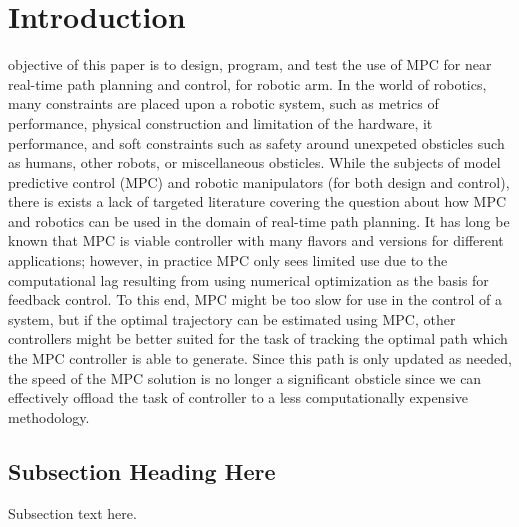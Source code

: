 \documentclass[journal]{IEEEtran}
\begin{document}
\section{Introduction}
%
%
%
%
 objective of this paper is to design, program, and test the use of MPC for near real-time path planning and control, for robotic arm. In the world of robotics, many constraints are placed upon a robotic system, such as metrics of performance, physical construction and limitation of the hardware, it performance, and soft constraints such as safety around unexpeted obsticles such as humans, other robots, or miscellaneous obsticles. While the subjects of model predictive control (MPC) and robotic manipulators (for both design and control), there is exists a lack of targeted literature covering the question about how MPC and robotics can be used in the domain of real-time path planning. It has long be known that MPC is viable controller with many flavors and versions for different applications; however, in practice MPC only sees limited use due to the computational lag resulting from using numerical optimization as the basis for feedback control. To this end, MPC might be too slow for use in the control of a system, but if the optimal trajectory can be estimated using MPC, other controllers might be better suited for the task of tracking the optimal path which the MPC controller is able to generate. Since this path is only updated as needed, the speed of the MPC solution is no longer a significant obsticle since we can effectively offload the task of controller to a less computationally expensive methodology.


\subsection{Subsection Heading Here}
Subsection text here.

\end{document}
